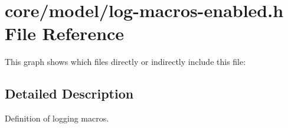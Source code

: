 \hypertarget{log-macros-enabled_8h}{}\section{core/model/log-\/macros-\/enabled.h File Reference}
\label{log-macros-enabled_8h}
This graph shows which files directly or indirectly include this file\+:


\subsection{Detailed Description}
Definition of logging macros. 